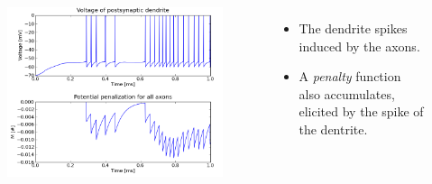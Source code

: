 \documentclass{beamer}
\begin{document}
	\begin{frame} 
		\begin{columns} 
				\begin{figure} 
					\centering
					\includegraphics[width=\textwidth]{graphics/demo/fig02} 
				\end{figure} 
				\begin{itemize} 
					\item The dendrite spikes induced by the axons. 
					\item A \alert{\emph{penalty} function} also accumulates, elicited by the spike of the dentrite. 
				\end{itemize}
		\end{columns}
	\end{frame}
\end{document}
